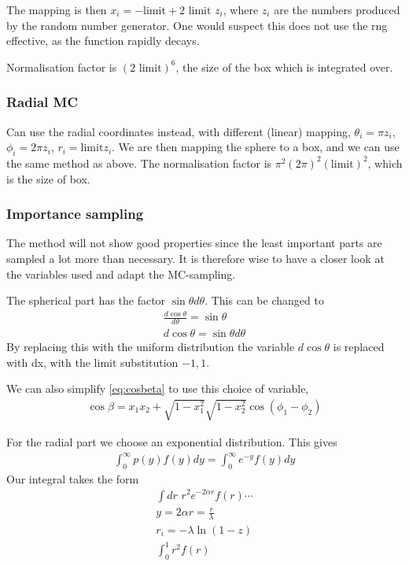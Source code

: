 \documentclass[11pt,a4paper,english,final]{article}
\numberwithin{equation}{section}
\begin{document}
The mapping is then $x_i = -\text{limit} + 
2\text{ limit } z_i$, where $z_i$ are the numbers 
produced by the random number generator. One would suspect this does 
not use the rng effective, as the function rapidly decays.

Normalisation factor is $(2\text{ limit})^6$, the size of the box 
which is integrated over.

\subsubsection{Radial MC}

Can use the radial coordinates instead, with different (linear) mapping,
$\theta_i = \pi z_i$, $\phi_i = 2\pi z_i$, $r_i = \text{limit} z_i$. 
We are then mapping the sphere to a box, and we can use the same method 
as above. The normalisation factor is $\pi^2(2\pi)^2(\text{limit})^2$,
which is the size of box.

\subsubsection{Importance sampling}

The method will not show good properties since the least important parts 
are sampled a lot more than necessary. It is therefore wise to have a 
closer look at the variables used and adapt the MC-sampling.

The spherical part has the factor $\sin\theta d\theta$. This can be 
changed to 
\begin{gather}
\frac{d\cos \theta}{d\theta} = \sin\theta\\
d\cos\theta = \sin \theta d\theta
\end{gather}
By replacing this with the uniform distribution the variable $d\cos\theta$
is replaced with dx, with the limit substitution $-1, 1$.

We can also simplify \eqref{eq:cosbeta} to use this choice of variable,
\begin{gather}
\cos\beta = x_1 x_2 + \sqrt{1-x_1^2}\sqrt{1-x_2^2}\cos(\phi_1-\phi_2)
\end{gather}

For the radial part we choose an exponential distribution. This gives 
\begin{gather}
\int_0^\infty p(y)f(y) dy = \int_0^\infty e^{-y}f(y) dy
\end{gather}
Our integral takes the form
\begin{gather}
\int \!\! dr \,\, r^2e^{-2\alpha r} f(r)\cdots\\
y = 2\alpha r = \frac{r}{\lambda}\\
r_i = -\lambda\ln(1-z)\\
\int_0^1 r^2f(r)
\end{gather}
\end{document}
